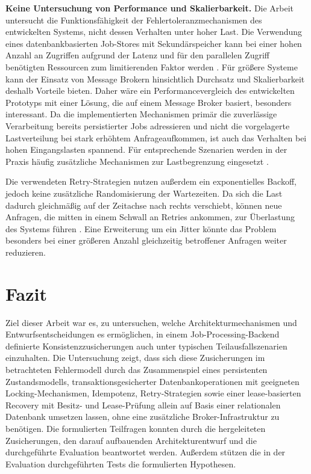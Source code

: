 \textbf{Keine Untersuchung von Performance und Skalierbarkeit.}
Die Arbeit untersucht die Funktionsfähigkeit der Fehlertoleranzmechanismen des entwickelten Systems, nicht dessen Verhalten unter hoher Last.
Die Verwendung eines datenbankbasierten Job-Stores mit Sekundärspeicher kann bei einer hohen Anzahl an Zugriffen aufgrund
der Latenz und für den parallelen Zugriff benötigten Ressourcen zum limitierenden Faktor werden
\parencite[Kap.~10 Abschnitt \glqq Example: analysis of user activity events\grqq]{kleppmann_designing_2017}.
Für größere Systeme kann der Einsatz von Message Brokern hinsichtlich Durchsatz und Skalierbarkeit deshalb Vorteile bieten.
Daher wäre ein Performancevergleich des entwickelten Prototyps mit einer Lösung, die auf einem Message Broker basiert, besonders
interessant.
Da die implementierten Mechanismen primär die zuverlässige Verarbeitung bereits persistierter Jobs adressieren und nicht
die vorgelagerte Lastverteilung bei stark erhöhtem Anfrageaufkommen, ist auch das Verhalten bei hohen Eingangslasten spannend.
Für entsprechende Szenarien werden in der Praxis häufig zusätzliche Mechanismen zur Lastbegrenzung eingesetzt \parencite{microsoft_corporation_hrsg_queue-based_2026}.

Die verwendeten Retry-Strategien nutzen außerdem ein exponentielles Backoff, jedoch keine zusätzliche Randomisierung der Wartezeiten.
Da sich die Last dadurch gleichmäßig auf der Zeitachse nach rechts verschiebt, können neue Anfragen, die mitten in einem
Schwall an Retries ankommen, zur Überlastung des Systems führen \parencite[Kap.~3 Abschnitt \glqq Jitter\grqq]{newman_building_2026}.
Eine Erweiterung um ein Jitter könnte das Problem besonders bei einer größeren Anzahl gleichzeitig betroffener Anfragen weiter reduzieren.

\section{Fazit}
\label{sec:fazit}
Ziel dieser Arbeit war es, zu untersuchen, welche Architekturmechanismen und Entwurfsentscheidungen es ermöglichen, in einem
Job-Processing-Backend definierte Konsistenzzusicherungen auch unter typischen Teilausfallszenarien einzuhalten.
Die Untersuchung zeigt, dass sich diese Zusicherungen im betrachteten Fehlermodell durch das Zusammenspiel eines persistenten
Zustandsmodells, transaktionsgesicherter Datenbankoperationen mit geeigneten Locking-Mechanismen, Idempotenz, Retry-Strategien
sowie einer lease-basierten Recovery mit Besitz- und Lease-Prüfung allein auf Basis einer relationalen Datenbank umsetzen lassen,
ohne eine zusätzliche Broker-Infrastruktur zu benötigen.
Die formulierten Teilfragen konnten durch die hergeleiteten Zusicherungen, den darauf aufbauenden Architekturentwurf und
die durchgeführte Evaluation beantwortet werden.
Außerdem stützen die in der Evaluation durchgeführten Tests die formulierten Hypothesen.

